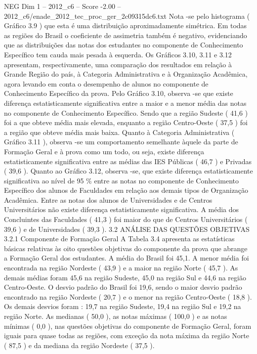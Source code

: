 \begin{textsample}{NEG Dim 1 – 2012\_c6 – Score -2.00 – 2012\_c6/enade\_2012\_tec\_proc\_ger\_2c09315dc6.txt}
Nota -se pelo histograma ( Gráfico 3.9 ) que esta é uma distribuição aproximadamente simétrica.
Em todas as regiões do Brasil o coeficiente de assimetria também é negativo, evidenciando que as distribuições das notas dos estudantes no componente de Conhecimento Específico tem cauda mais pesada à esquerda.
Os Gráficos 3.10, 3.11 e 3.12 apresentam, respectivamente, uma comparação dos resultados em relação à Grande Região do país, à Categoria Administrativa e à Organização Acadêmica, agora levando em conta o desempenho de alunos no componente de Conhecimento Específico da prova.
Pelo Gráfico 3.10, observa -se que existe diferença estatisticamente significativa entre a maior e a menor média das notas no componente de Conhecimento Específico.
Sendo que a região Sudeste ( 41,6 ) foi a que obteve média mais elevada, enquanto a região Centro-Oeste ( 37,5 ) foi a região que obteve média mais baixa.
Quanto à Categoria Administrativa ( Gráfico 3.11 ), observa -se um comportamento semelhante àquele da parte de Formação Geral e à prova como um todo, ou seja, existe diferença estatisticamente significativa entre as médias das IES Públicas ( 46,7 ) e Privadas ( 39,6 ).
Quanto ao Gráfico 3.12, observa -se, que existe diferença estatisticamente significativa ao nível de 95 \% entre as notas no componente de Conhecimento Específico dos alunos de Faculdades em relação aos demais tipos de Organização Acadêmica.
Entre as notas dos alunos de Universidades e de Centros Universitários não existe diferença estatisticamente significativa.
A média dos Concluintes das Faculdades ( 41,3 ) foi maior do que de Centros Universitários ( 39,6 ) e de Universidades ( 39,3 ). 3.2 ANÁLISE DAS QUESTÕES OBJETIVAS 3.2.1 Componente de Formação Geral A Tabela 3.4 apresenta as estatísticas básicas relativas às oito questões objetivas do componente da prova que abrange a Formação Geral dos estudantes.
A média do Brasil foi 45,1.
A menor média foi encontrada na região Nordeste ( 43,9 ) e a maior na região Norte ( 45,7 ).
As demais médias foram 45,6 na região Sudeste, 45,0 na região Sul e 44,6 na região Centro-Oeste.
O desvio padrão do Brasil foi 19,6, sendo o maior desvio padrão encontrado na região Nordeste ( 20,7 ) e o menor na região Centro-Oeste ( 18,8 ).
Os demais desvios foram : 19,7 na região Sudeste, 19,4 na região Sul e 19,2 na região Norte.
As medianas ( 50,0 ), as notas máximas ( 100,0 ) e as notas mínimas ( 0,0 ), nas questões objetivas do componente de Formação Geral, foram iguais para quase todas as regiões, com exceção da nota máxima da região Norte ( 87,5 ) e da mediana da região Nordeste ( 37,5 ).

\end{textsample}
